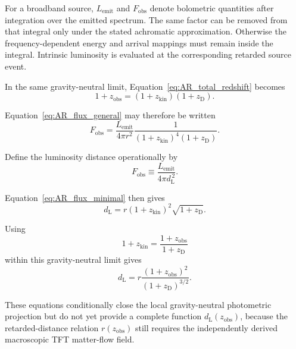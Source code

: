 For a broadband source, \(L_{\mathrm{emit}}\) and \(F_{\mathrm{obs}}\)
denote bolometric quantities after integration over the emitted spectrum.
The same factor can be removed from that integral only under the stated
achromatic approximation. Otherwise the frequency-dependent energy and
arrival mappings must remain inside the integral. Intrinsic luminosity is
evaluated at the corresponding retarded source event.

In the same gravity-neutral limit,
Equation~\eqref{eq:AR_total_redshift} becomes
\begin{equation}
    1+z_{\mathrm{obs}}
    =
    (1+z_{\mathrm{kin}})
    (1+z_{\mathrm D}).
\end{equation}

Equation~\eqref{eq:AR_flux_general} may therefore be written
\begin{equation}
    \boxed{
    F_{\mathrm{obs}}
    =
    \frac{
        L_{\mathrm{emit}}
    }{
        4\pi r^2
    }
    \frac{1}{
        (1+z_{\mathrm{kin}})^4
        (1+z_{\mathrm D})
    }.
    }
    \label{eq:AR_flux_minimal}
\end{equation}

Define the luminosity distance operationally by
\begin{equation}
    F_{\mathrm{obs}}
    \equiv
    \frac{
        L_{\mathrm{emit}}
    }{
        4\pi d_{\mathrm L}^{\,2}
    }.
\end{equation}

Equation~\eqref{eq:AR_flux_minimal} then gives
\begin{equation}
    \boxed{
    d_{\mathrm L}
    =
    r
    (1+z_{\mathrm{kin}})^2
    \sqrt{
        1+z_{\mathrm D}
    }.
    }
    \label{eq:AR_dL_conditional}
\end{equation}

Using
\begin{equation}
    1+z_{\mathrm{kin}}
    =
    \frac{
        1+z_{\mathrm{obs}}
    }{
        1+z_{\mathrm D}
    }
\end{equation}
within this gravity-neutral limit gives
\begin{equation}
    \boxed{
    d_{\mathrm L}
    =
    r
    \frac{
        (1+z_{\mathrm{obs}})^2
    }{
        (1+z_{\mathrm D})^{3/2}
    }.
    }
    \label{eq:AR_dL_zD}
\end{equation}

These equations conditionally close the local gravity-neutral photometric
projection but do not yet provide a complete function
\(d_{\mathrm L}(z_{\mathrm{obs}})\), because the retarded-distance relation
\(r(z_{\mathrm{obs}})\) still requires the independently derived macroscopic
TFT matter-flow field.


